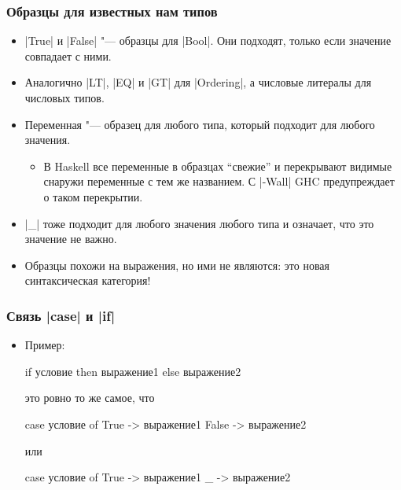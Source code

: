 \documentclass[10pt]{beamer}
\begin{document}
\begin{frame}[fragile]
  \frametitle{Образцы для известных нам типов}
  \begin{itemize}
    \item \haskinline|True| и \haskinline|False| "--- образцы для \haskinline|Bool|. Они подходят, только если значение совпадает с ними.
    \item Аналогично \haskinline|LT|, \haskinline|EQ| и \haskinline|GT| для \haskinline|Ordering|, а числовые литералы для числовых типов.
    \item Переменная "--- образец для любого типа, который подходит для любого значения.
          \begin{itemize}
            \item В Haskell все переменные в образцах \enquote{свежие} и перекрывают видимые снаружи переменные с тем же названием. С \ghcinline|-Wall| GHC предупреждает о таком перекрытии.
          \end{itemize}
    \item \haskinline|_| тоже подходит для любого значения любого типа и означает, что это значение не важно.
    \item Образцы похожи на выражения, но ими не являются: это новая синтаксическая категория!
  \end{itemize}
\end{frame}

\begin{frame}[fragile]
  \frametitle{Связь \haskinline|case| и \haskinline|if|}
  \begin{itemize}
    \item Пример:
          \begin{haskell}
            if условие 
                then выражение1 
                else выражение2
          \end{haskell}
          это ровно то же самое, что
          \begin{haskell}
            case условие of
                True -> выражение1 
                False -> выражение2
          \end{haskell}
          или
          \begin{haskell}
            case условие of
                True -> выражение1 
                _ -> выражение2
          \end{haskell}
  \end{itemize}
\end{frame}
\end{document}
